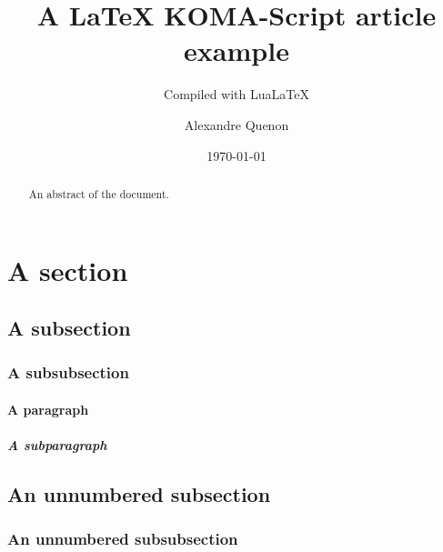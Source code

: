 \documentclass[fontsize=11pt, paper=portait,A4]{scrartcl}
\title{A \LaTeX{} KOMA-Script article example}
\subtitle{Compiled with Lua\LaTeX{}}
\author{Alexandre Quenon}
\date{\today}
\begin{document}

\maketitle

\tableofcontents


\begin{abstract}
	An abstract of the document.
	
	\lipsum[1-2]
\end{abstract}


\section{A section}

	\lipsum[1]
	
	
	\subsection{A subsection}
	
		\lipsum[2]
		
		
		\subsubsection{A subsubsection}
		
			\lipsum[3]
			
			
			\paragraph{A paragraph}
			
				\lipsum[4]
				
				
				\subparagraph{A subparagraph}
				
					\lipsum[5]
				
				
					
						\lipsum[6]



	\lipsum[1]
	
	
	\subsection*{An unnumbered subsection}
	
		\lipsum[2]
		
		
		\subsubsection*{An unnumbered subsubsection}
			
			\lipsum[3]



\end{document}
